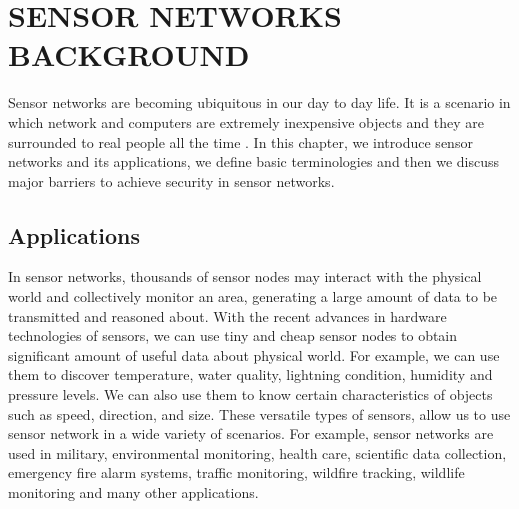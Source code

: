\chapter{SENSOR NETWORKS BACKGROUND} 
\label{cha:Sensor Networks/Data Aggregation/Security Background}
	
	Sensor networks are becoming ubiquitous in our day to day life. 
	It is a scenario in which network and computers are extremely inexpensive objects and they are surrounded to real people all the time \cite{2002-Stajano-ubiquitous}.	
	In this chapter, we introduce sensor networks and its applications, we define basic terminologies and then we discuss major 
	barriers to achieve security in sensor networks.

\section{Applications}
	In sensor networks, thousands of sensor nodes may interact with the physical world and collectively monitor an area, generating a large amount of data to be transmitted and reasoned about.
	With the recent advances in hardware technologies of sensors, we can use tiny and cheap sensor nodes to obtain significant amount of useful data about physical world.
	For example, we can use them to discover temperature, water quality, lightning condition, humidity and pressure levels. 
	We can also use them to know certain characteristics of objects such as speed, direction, and size.
	These versatile types of sensors, allow us to use sensor network in a wide variety of scenarios.
	For example, sensor networks are used in military, environmental monitoring, health care, scientific data collection, emergency fire alarm systems, traffic monitoring, wildfire tracking, wildlife monitoring and many other applications.
	
